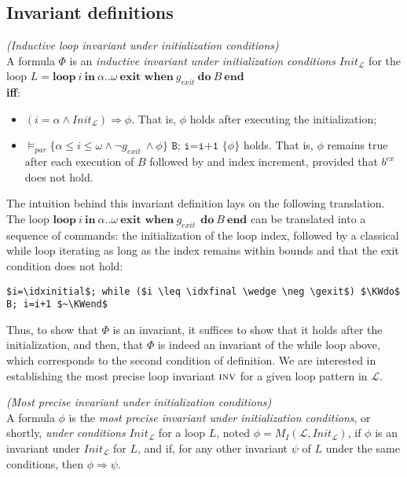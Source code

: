 \documentclass[a4paper,10pt]{article}
\newcommand{\prog}{\ensuremath{\mathcal{L}}\xspace}
\newcommand{\idx}{\ensuremath{i}\xspace}
\newcommand{\idxinitial}{\ensuremath{\alpha}\xspace}
\newcommand{\idxfinal}{\ensuremath{\omega}\xspace}
\newcommand{\KWloop}{\ensuremath{\mathrm{\textbf{loop}}~}}
\newcommand{\KWdo}{\ensuremath{\mathrm{\textbf{do}}~}}
\newcommand{\KWend}{\ensuremath{\mathrm{\textbf{end}}}}
\newcommand{\KWin}{\ensuremath{~\mathrm{\textbf{in}}~}}
\newcommand{\KWexit}{\ensuremath{\mathrm{\textbf{exit when}}~}}
\newcommand{\gexit}{\ensuremath{\mathit{g_{exit}~}}}
\newcommand{\inv}{\ensuremath{\textsc{inv}}\xspace}
\newcommand{\initcond}[1]{\ensuremath{\mathit{Init_{#1}}}}
\newenvironment{definition}[1][Definition]{\begin{trivlist}
\item[\hskip \labelsep {\bfseries #1}]}{\end{trivlist}}
\begin{document}
\subsection{Invariant definitions}

\begin{definition} \emph {(Inductive loop invariant under initialization conditions)}\\
A formula $\Phi$ is an \textit{inductive invariant under initialization conditions} \initcond{\prog} for the loop 
\hspace{1cm} $L = \KWloop  \idx \KWin \idxinitial ..\idxfinal ~ \KWexit \gexit \KWdo B ~\KWend$ \\
\textbf{iff}: 
\begin{itemize}
\item $(\idx=\idxinitial \land \initcond{\prog}) \Rightarrow \phi$. 
      That is, $\phi$ holds after executing the initialization;
\item $\vDash_{par} \{\idxinitial \leq \idx \leq \idxfinal \wedge \neg \gexit \wedge\phi \} \texttt{ B; i=i+1 } \{ \phi \}$ holds. 
      That is, $\phi$ remains true after each execution of $B$ followed by and index increment, 
      provided that $b^{ex}$ does not hold.
\end{itemize}
\end{definition}

The intuition behind this invariant definition lays on the following translation.
The loop $\KWloop  \idx \KWin \idxinitial ..\idxfinal ~ \KWexit \gexit ~ \KWdo B ~\KWend$ 
can be translated into a sequence of commands: the initialization of the loop index, 
followed by a classical while loop iterating as long as the index remains within bounds
and that the exit condition does not hold:
{\small
\begin{lstlisting}[mathescape]
   $i=\idxinitial$; while ($i \leq \idxfinal \wedge \neg \gexit$) $\KWdo$ B; i=i+1 $~\KWend$
\end{lstlisting}
}
Thus, to show that $\Phi$ is an invariant, it suffices to show that it holds after 
the initialization, and then, that $\Phi$ is indeed an invariant of the while loop above, 
which corresponds to the second condition of definition.
We are interested in establishing  the most precise loop invariant \inv for a given loop pattern in \prog.

\begin{definition} \emph {(Most precise invariant under initialization conditions)}\\
A formula $\phi$ is the \textit{most precise invariant under initialization conditions}, 
or shortly, \textit{under conditions} \initcond{\prog} for a loop $L$, noted $\phi = M_I(\prog, \initcond{\prog})$, 
if $\phi$ is an invariant under \initcond{\prog} for $L$, and if, for any other invariant $\psi$ of $L$ 
under the same conditions, then $\phi \Rightarrow \psi$.
\end{definition}
\end{document}
